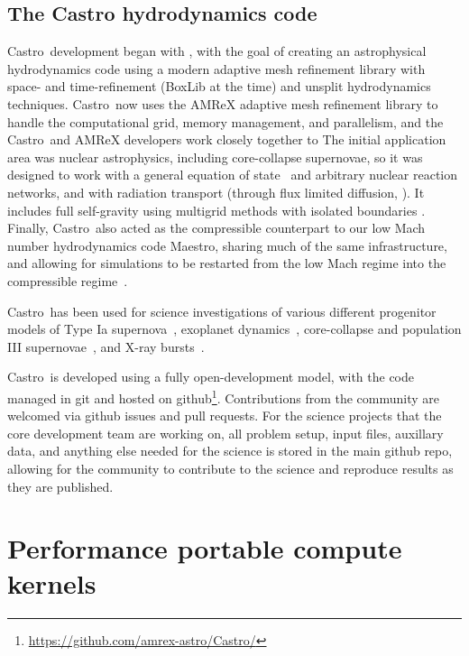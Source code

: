 \documentclass[preprint,times]{aastex62}
\newcommand{\castro}{{\sf Castro}}
\newcommand{\maestro}{{\sf Maestro}}
\begin{document}
\subsection{The Castro hydrodynamics code}

\castro\ development began with \cite{castro}, with the goal of
creating an astrophysical hydrodynamics code using a modern adaptive
mesh refinement library with space- and time-refinement (BoxLib at the
time) and unsplit hydrodynamics techniques.  \castro\ now uses the
AMReX adaptive mesh refinement library to handle the computational
grid, memory management, and parallelism, and the \castro\ and AMReX
developers work closely together to The initial application area was
nuclear astrophysics, including core-collapse supernovae, so it was
designed to work with a general equation of state~\citep{zingalekatz}
and arbitrary nuclear reaction networks, and with radiation transport
(through flux limited diffusion, \citealt{castro2,castro3}).  It
includes full self-gravity using multigrid methods with isolated
boundaries \citep{katz:2016}.  Finally, \castro\ also acted as the
compressible counterpart to our low Mach number hydrodynamics code
\maestro, sharing much of the same infrastructure, and allowing for
simulations to be restarted from the low Mach regime into the
compressible regime~\citep{malone:2014}.

\castro\ has been used for science investigations of various different
progenitor models of Type Ia
supernova~\citep{malone:2014,katz:2016,polin:2019}, exoplanet
dynamics~\citep{ryu:2018}, core-collapse and population III
supernovae~\citep{chen:2014,dolence:2015,chen:2017}, and X-ray
bursts~\citep{astronum:2018}.

\castro\ is developed using a fully open-development model, with the
code managed in git and hosted on
github\footnote{\url{https://github.com/amrex-astro/Castro/}}.
Contributions from the community are welcomed via github issues and
pull requests.  For the science projects that the core development
team are working on, all problem setup, input files, auxillary data,
and anything else needed for the science is stored in the main github
repo, allowing for the community to contribute to the science and
reproduce results as they are published.

\section{Performance portable compute kernels}
\end{document}
